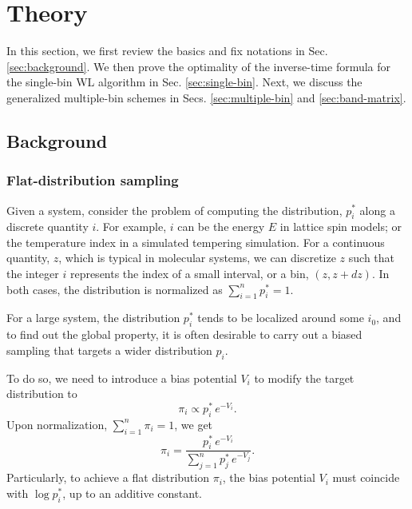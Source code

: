 \documentclass[reprint]{revtex4-1}
\begin{document}
\section{\label{sec:theory}
Theory}


In this section,
we first review the basics and fix notations
in Sec. \ref{sec:background}.
%
We then prove the optimality
of the inverse-time formula
for the single-bin WL algorithm
in Sec. \ref{sec:single-bin}.
%
Next, we discuss the generalized
multiple-bin schemes
in Secs. \ref{sec:multiple-bin}
and \ref{sec:band-matrix}.
%



\subsection{\label{sec:background}
Background}



\subsubsection{Flat-distribution sampling}



Given a system,
consider the problem of computing
the distribution, $p^*_i$
along a discrete quantity $i$.
%
%
For example, $i$ can be the energy $E$
in lattice spin models; or the temperature index
in a simulated tempering simulation.
%
For a continuous quantity, $z$,
which is typical in molecular systems,
we can discretize $z$
such that the integer $i$ represents
the index of a small interval, or a bin, $(z, z + dz)$.
%
In both cases,
the distribution is normalized as
$\sum_{i = 1}^n p^*_i = 1$.



For a large system,
the distribution $p^*_i$ tends to
be localized around some $i_0$,
%
and to find out the global property,
it is often desirable to carry out
a biased sampling that targets
a wider distribution $p_i$.
%



To do so, we need to introduce a bias potential $V_i$
to modify the target distribution to
%
\begin{equation}
  \pi_i \propto p^*_i \, e^{-V_i}.
  \label{eq:pi_p_phi1}
\end{equation}
%
Upon normalization, $\sum_{i = 1}^n \pi_i = 1$,
we get
%
\begin{equation}
  \pi_i =
  \frac{ p^*_i \, e^{-V_i} }
  { \sum_{j = 1}^n p^*_j \, e^{-V_j} }.
  \label{eq:pi_p_phi}
\end{equation}
%
Particularly,
to achieve a flat distribution $\pi_i$,
the bias potential $V_i$
must coincide with $\log p^*_i$,
up to an additive constant.
\end{document}
